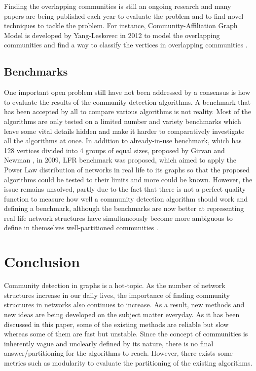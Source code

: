 \documentclass[10pt]{article}
\begin{document}
Finding the overlapping communities is still an ongoing research and many papers are being published each year to evaluate the problem and to find novel techniques to tackle the problem. For instance, Community-Affiliation Graph Model is developed by Yang-Leskovec in 2012 to model the overlapping communities and find a way to classify the vertices in overlapping communities \cite{overlapping}. \\

\subsection{Benchmarks}
One important open problem still have not been addressed by a consensus is how to evaluate the results of the community detection algorithms. A benchmark that has been accepted by all to compare various algorithms is not reality\cite{fortunato}. Most of the algorithms are only tested on a limited number and variety benchmarks which leave some vital details hidden and make it harder to comparatively investigate all the algorithms at once. In addition to already-in-use benchmark, which has 128 vertices divided into 4 groups of equal sizes, proposed by Girvan and Newman \cite{raghavan}, in 2009, LFR benchmark was proposed, which aimed to apply the Power Law distribution of networks in real life to its graphs so that the proposed algorithms could be tested to their limits and more could be known\cite{cdbible}. However, the issue remains unsolved, partly due to the fact that there is not a perfect quality function to measure how well a community detection algorithm should work and defining a benchmark, although the benchmarks are now better at representing real life network structures have simultaneously become more ambiguous to define in themselves well-partitioned communities \cite{fortunato}. \\

\section{Conclusion}

Community detection in graphs is a hot-topic. As the number of network structures increase in our daily lives, the importance of finding community structures in networks also continues to increase. As a result, new methods and new ideas are being developed on the subject matter everyday. As it has been discussed in this paper, some of the existing methods are reliable but slow whereas some of them are fast but unstable. Since the concept of communities is inherently vague and unclearly defined by its nature, there is no final answer/partitioning for the algorithms to reach. However, there exists some metrics such as modularity to evaluate the partitioning of the existing algorithms. \\
\end{document}
